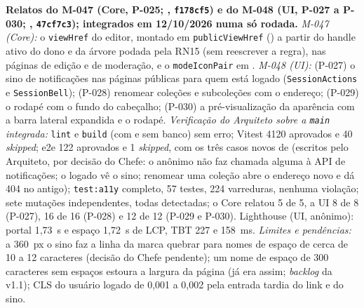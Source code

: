 \noindent{}\quad \textbf{Relatos do M-047 (Core, P-025; , \texttt{f178cf5}) e do M-048 (UI, P-027 a P-030; , \texttt{47cf7c3}); integrados em 12/10/2026 numa só rodada.} \emph{M-047 (Core):} o \texttt{viewHref} do editor, montado em \texttt{publicViewHref} () a partir do handle ativo do dono e da árvore podada pela RN15 (sem reescrever a regra), nas páginas de edição e de moderação, e o \texttt{modeIconPair} em . \emph{M-048 (UI):} (P-027) o sino de notificações nas páginas públicas para quem está logado (\texttt{SessionActions} e \texttt{SessionBell}); (P-028) renomear coleções e subcoleções com o endereço; (P-029) o rodapé com o fundo do cabeçalho; (P-030) a pré-visualização da aparência com a barra lateral expandida e o rodapé. \emph{Verificação do Arquiteto sobre a \texttt{main} integrada:} \texttt{lint} e \texttt{build} (com e sem banco) sem erro; Vitest 4120 aprovados e 40 \emph{skipped}; e2e 122 aprovados e 1 \emph{skipped}, com os três casos novos de  (escritos pelo Arquiteto, por decisão do Chefe: o anônimo não faz chamada alguma à API de notificações; o logado vê o sino; renomear uma coleção abre o endereço novo e dá 404 no antigo); \texttt{test:a11y} completo, 57 testes, 224 varreduras, nenhuma violação; sete mutações independentes, todas detectadas; o Core relatou 5 de 5, a UI 8 de 8 (P-027), 16 de 16 (P-028) e 12 de 12 (P-029 e P-030). Lighthouse (UI, anônimo): portal 1,73~s e espaço 1,72~s de LCP, TBT 227 e 158~ms. \emph{Limites e pendências:} a 360~px o sino faz a linha da marca quebrar para nomes de espaço de cerca de 10 a 12 caracteres (decisão do Chefe pendente); um nome de espaço de 300 caracteres sem espaços estoura a largura da página (já era assim; \emph{backlog} da v1.1); CLS do usuário logado de 0,001 a 0,002 pela entrada tardia do link e do sino.

